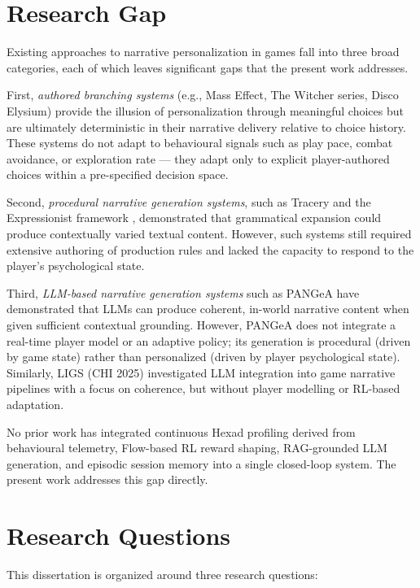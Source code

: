 \documentclass[12pt,a4paper]{report}
\begin{document}
\section{Research Gap}

Existing approaches to narrative personalization in games fall into three broad categories, each of which leaves significant gaps that the present work addresses.

First, \textit{authored branching systems} (e.g., Mass Effect, The Witcher series, Disco Elysium) provide the illusion of personalization through meaningful choices but are ultimately deterministic in their narrative delivery relative to choice history. These systems do not adapt to behavioural signals such as play pace, combat avoidance, or exploration rate --- they adapt only to explicit player-authored choices within a pre-specified decision space.

Second, \textit{procedural narrative generation systems}, such as Tracery \citep{compton2015tracery} and the Expressionist framework \citep{kreminski2019evaluating}, demonstrated that grammatical expansion could produce contextually varied textual content. However, such systems still required extensive authoring of production rules and lacked the capacity to respond to the player's psychological state.

Third, \textit{LLM-based narrative generation systems} such as PANGeA \citep{todd2024pangea} have demonstrated that LLMs can produce coherent, in-world narrative content when given sufficient contextual grounding. However, PANGeA does not integrate a real-time player model or an adaptive policy; its generation is procedural (driven by game state) rather than personalized (driven by player psychological state). Similarly, LIGS (CHI 2025) investigated LLM integration into game narrative pipelines with a focus on coherence, but without player modelling or RL-based adaptation.

No prior work has integrated continuous Hexad profiling derived from behavioural telemetry, Flow-based RL reward shaping, RAG-grounded LLM generation, and episodic session memory into a single closed-loop system. The present work addresses this gap directly.

\section{Research Questions}

This dissertation is organized around three research questions:
\end{document}
